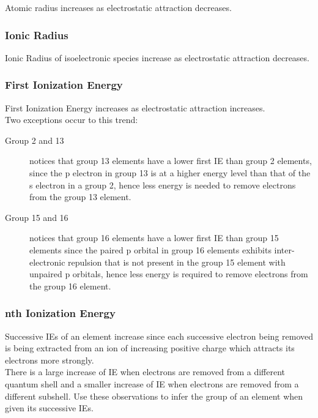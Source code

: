 \documentclass[../main]{subfiles}
\begin{document}

	Atomic radius increases as electrostatic attraction decreases.

	\subsubsection{Ionic Radius}


	Ionic Radius of isoelectronic species increase as electrostatic attraction decreases.

	\subsubsection{First Ionization Energy}


	First Ionization Energy increases as electrostatic attraction increases. \\

	Two exceptions occur to this trend:

	\begin{description}
		\item[Group 2 and 13] notices that group 13 elements have a lower first IE than group 2 elements, since the p electron in group 13 is at a higher energy level than that of the s electron in a group 2, hence less energy is needed to remove electrons from the group 13 element.
		\item[Group 15 and 16] notices that group 16 elements have a lower first IE than group 15 elements since the paired p orbital in group 16 elements exhibits inter-electronic repulsion that is not present in the group 15 element with unpaired p orbitals, hence less energy is required to remove electrons from the group 16 element.
	\end{description}

	\subsubsection{nth Ionization Energy}

	Successive IEs of an element increase since each successive electron being removed is being extracted from an ion of increasing positive charge which attracts its electrons more strongly. \\

	There is a large increase of IE when electrons are removed from a different quantum shell and a smaller increase of IE when electrons are removed from a different subshell. Use these observations to infer the group of an element when given its successive IEs.
\end{document}

